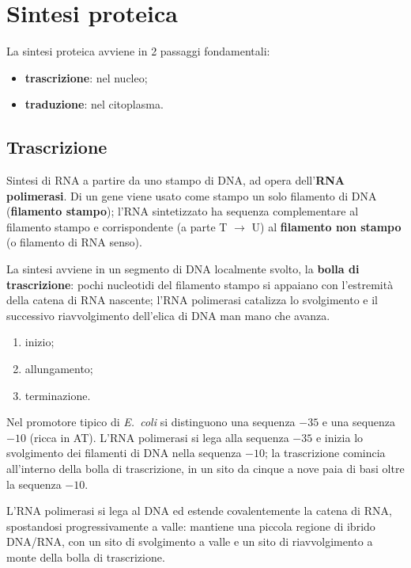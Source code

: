 \section{Sintesi proteica}

La sintesi proteica avviene in 2 passaggi fondamentali:
\begin{itemize}
  \item \textbf{trascrizione}: nel nucleo;
  \item \textbf{traduzione}: nel citoplasma.
\end{itemize}

\subsection{Trascrizione}

Sintesi di RNA a partire da uno stampo di DNA, ad opera dell'\textbf{RNA polimerasi}. Di un gene viene usato come stampo un solo filamento di DNA (\textbf{filamento stampo}); l'RNA sintetizzato ha sequenza complementare al filamento stampo e corrispondente (a parte T $\rightarrow$ U) al \textbf{filamento non stampo} (o filamento di RNA senso).

La sintesi avviene in un segmento di DNA localmente svolto, la \textbf{bolla di trascrizione}: pochi nucleotidi del filamento stampo si appaiano con l'estremità della catena di RNA nascente; l'RNA polimerasi catalizza lo svolgimento e il successivo riavvolgimento dell'elica di DNA man mano che avanza.

\begin{enumerate}
  \item inizio;
  \item allungamento;
  \item terminazione.
\end{enumerate}

Nel promotore tipico di \textit{E.\ coli} si distinguono una sequenza $-35$ e una sequenza $-10$ (ricca in AT). L'RNA polimerasi si lega alla sequenza $-35$ e inizia lo svolgimento dei filamenti di DNA nella sequenza $-10$; la trascrizione comincia all'interno della bolla di trascrizione, in un sito da cinque a nove paia di basi oltre la sequenza $-10$.

L'RNA polimerasi si lega al DNA ed estende covalentemente la catena di RNA, spostandosi progressivamente a valle: mantiene una piccola regione di ibrido DNA/RNA, con un sito di svolgimento a valle e un sito di riavvolgimento a monte della bolla di trascrizione.


